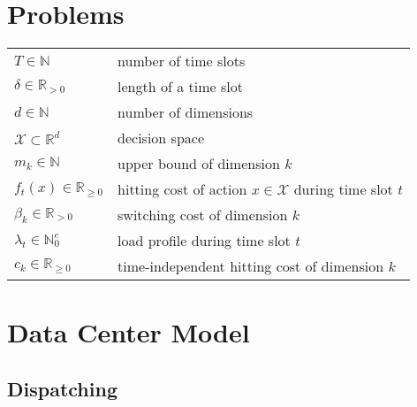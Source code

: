 \label{chapter:notation}

\section*{Problems}

\begin{tabularx}{\textwidth}{lX}
    $T \in \mathbb{N}$ & number of time slots \\
    $\delta \in \mathbb{R}_{>0}$ & length of a time slot \\
    $d \in \mathbb{N}$ & number of dimensions \\
    $\mathcal{X} \subset \mathbb{R}^d$ & decision space \\
    $m_k \in \mathbb{N}$ & upper bound of dimension $k$ \\
    $f_t(x) \in \mathbb{R}_{\geq 0}$ & hitting cost of action $x \in \mathcal{X}$ during time slot $t$ \\
    $\beta_k \in \mathbb{R}_{>0}$ & switching cost of dimension $k$ \\
    $\lambda_t \in \mathbb{N}_0^e$ & load profile during time slot $t$ \\
    $c_k \in \mathbb{R}_{\geq 0}$ & time-independent hitting cost of dimension $k$ \\
\end{tabularx}

\section*{Data Center Model}

\subsection*{Dispatching}

